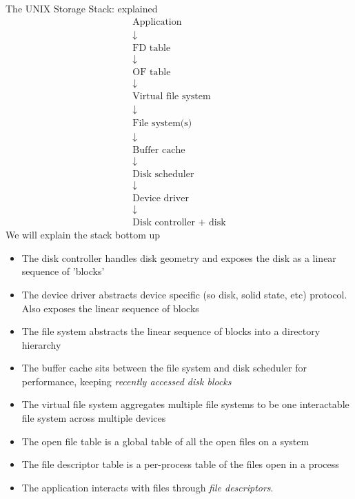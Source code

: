 \documentclass[journal, letterpaper]{IEEEtran}
\begin{document}
\begin{theory}{The UNIX Storage Stack: explained}
    \begin{gather*}
    \text{Application} \\
    \downarrow \\
    \text{FD table} \\
    \downarrow \\ 
    \text{OF table} \\ 
    \downarrow \\ 
    \text{Virtual file system} \\
    \downarrow \\
    \text{File system(s)}\\
    \downarrow \\
    \text{Buffer cache} \\ 
    \downarrow \\
    \text{Disk scheduler} \\
    \downarrow \\
    \text{Device driver} \\
    \downarrow \\
    \text{Disk controller + disk}
    \end{gather*}
    We will explain the stack bottom up
    \begin{itemize}
        \item The disk controller handles disk geometry and exposes the disk as a linear sequence of 'blocks'
        \item The device driver abstracts device specific (so disk, solid state, etc) protocol. Also exposes the linear sequence of blocks
        \item The file system abstracts the linear sequence of blocks into a directory hierarchy
        \item The buffer cache sits between the file system and disk scheduler for performance, keeping \textit{recently accessed disk blocks}
        \item The virtual file system aggregates multiple file systems to be one interactable file system across multiple devices
        \item The open file table is a global table of all the open files on a system
        \item The file descriptor table is a per-process table of the files open in a process
        \item The application interacts with files through \textit{file descriptors}.
    \end{itemize}
\end{theory}
\end{document}
